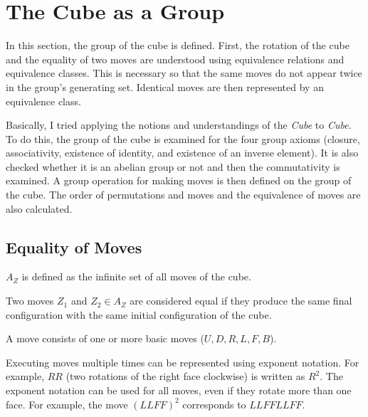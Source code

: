 \section{The Cube as a Group}
\label{Chapter_CubeAsGroup}

In this section, the group of the \Ttwo cube is defined. First, the rotation of the cube and the equality of two moves are understood using equivalence relations and equivalence classes. This is necessary so that the same moves do not appear twice in the group's generating set. Identical moves are then represented by an equivalence class.

Basically, I tried applying the notions and understandings of the \Tthree \textit{Cube} \cite{JC} to \Ttwo \textit{Cube}.
To do this, the group of the \Ttwo cube is examined for the four group axioms (closure, associativity, existence of identity, and existence of an inverse element). It is also checked whether it is an abelian group or not and then the commutativity is examined. A group operation for making moves is then defined on the group of the \Ttwo cube. The order of permutations and moves and the equivalence of moves are also calculated.

\subsection{Equality of Moves}
\label{Section_EqualityOfmoves}

\begin{definition}
  $A_Z$ is defined as the infinite set of all moves of the cube.  
\end{definition}
\begin{definition}
Two moves $Z_1$ and $Z_2 \in A_Z$ are considered equal if they produce the same final configuration with the same initial configuration of the cube.
\end{definition}
A move consists of one or more basic moves ($U, D, R, L, F, B$).

\begin{notation}
 Executing moves multiple times can be represented using exponent notation. For example, $RR$ (two rotations of the right face clockwise) is  written as $R^2$. The exponent notation can be used for all moves, even if they rotate more than one face. For example, the move $(LLFF)^2$  corresponds to $LLFFLLFF$.   
\end{notation}

